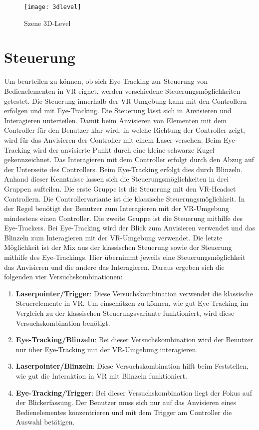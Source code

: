 \begin{figure}[!htbp]
	\centering
	\texttt{[image: 3dlevel]}
	\caption[Szene 3D-Level]{Szene 3D-Level}
	\label{fig:3D-Level}
\end{figure}

\section{Steuerung}
Um beurteilen zu können, ob sich Eye-Tracking zur Steuerung von Bedienelementen in \ac{VR} eignet, werden verschiedene Steuerungsmöglichkeiten getestet. Die Steuerung innerhalb der \ac{VR}-Umgebung kann mit den Controllern erfolgen und mit Eye-Tracking. Die Steuerung lässt sich in Anvisieren und Interagieren unterteilen. Damit beim Anvisieren von Elementen mit dem Controller für den Benutzer klar wird, in welche Richtung der Controller zeigt, wird für das Anvisieren der Controller mit einem Laser versehen. Beim Eye-Tracking wird der anvisierte Punkt durch eine kleine schwarze Kugel gekennzeichnet. Das Interagieren mit dem Controller erfolgt durch den Abzug auf der Unterseite des Controllers. Beim Eye-Tracking erfolgt dies durch Blinzeln.\\
Anhand dieser Kenntnisse lassen sich die Steuerungsmöglichkeiten in drei Gruppen aufteilen. Die erste Gruppe ist die Steuerung mit den \ac{VR}-Headset Controllern. Die Controllervariante ist die klassische Steuerungsmöglichkeit. In der Regel benötigt der Benutzer zum Interagieren mit der \ac{VR}-Umgebung mindestens einen Controller. Die zweite Gruppe ist die Steuerung mithilfe des Eye-Trackers. Bei Eye-Tracking wird der Blick zum Anvisieren verwendet und das Blinzeln zum Interagieren mit der \ac{VR}-Umgebung verwendet. Die letzte Möglichkeit ist der Mix aus der klassischen Steuerung sowie der Steuerung mithilfe des Eye-Trackings. Hier übernimmt jeweils eine Steuerungsmöglichkeit das Anvisieren und die andere das Interagieren. Daraus ergeben sich die folgenden vier Versuchskombinationen:

\begin{enumerate}
	\item \textbf{Laserpointer/Trigger}: Diese Versuchskombination verwendet die klassische Steuerelemente in \ac{VR}. Um einschätzen zu können, wie gut Eye-Tracking im Vergleich zu der klassischen Steuerungsvariante funktioniert, wird diese Versuchskombination benötigt. 
	\item \textbf{Eye-Tracking/Blinzeln}: Bei dieser Versuchskombination wird der Benutzer nur über Eye-Tracking mit der \ac{VR}-Umgebung interagieren. 
	\item \textbf{Laserpointer/Blinzeln}: Diese Versuchskombination hilft beim Feststellen, wie gut die Interaktion in \ac{VR} mit Blinzeln funktioniert. 
	\item \textbf{Eye-Tracking/Trigger}: Bei dieser Versuchskombination liegt der Fokus auf der Blickerfassung. Der Benutzer muss sich nur auf das Anvisieren eines Bedienelementes konzentrieren und mit dem Trigger am Controller die Auswahl betätigen.
\end{enumerate}

